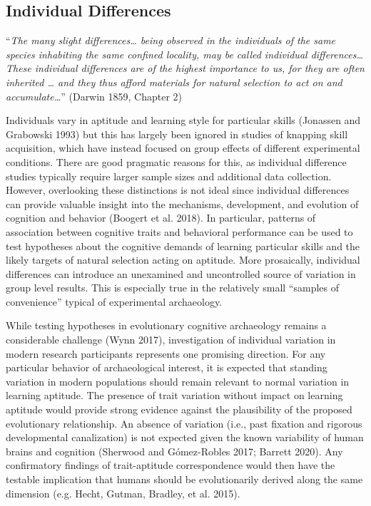 \documentclass[smallextended]{svjour3}       %
\begin{document}
\hypertarget{individual-differences}{%
\subsection{\texorpdfstring{\textbf{Individual
Differences}}{Individual Differences}}\label{individual-differences}}

``\emph{The many slight differences\ldots{} being observed in the
individuals of the same species inhabiting the same confined locality,
may be called individual differences\ldots{} These individual
differences are of the highest importance to us, for they are often
inherited \ldots{} and they thus afford materials for natural selection
to act on and accumulate\ldots{}}'' (Darwin 1859, Chapter 2)

Individuals vary in aptitude and learning style for particular skills
(Jonassen and Grabowski 1993) but this has largely been ignored in
studies of knapping skill acquisition, which have instead focused on
group effects of different experimental conditions. There are good
pragmatic reasons for this, as individual difference studies typically
require larger sample sizes and additional data collection. However,
overlooking these distinctions is not ideal since individual differences
can provide valuable insight into the mechanisms, development, and
evolution of cognition and behavior (Boogert et al. 2018). In
particular, patterns of association between cognitive traits and
behavioral performance can be used to test hypotheses about the
cognitive demands of learning particular skills and the likely targets
of natural selection acting on aptitude. More prosaically, individual
differences can introduce an unexamined and uncontrolled source of
variation in group level results. This is especially true in the
relatively small ``samples of convenience'' typical of experimental
archaeology.

While testing hypotheses in evolutionary cognitive archaeology remains a
considerable challenge (Wynn 2017), investigation of individual
variation in modern research participants represents one promising
direction. For any particular behavior of archaeological interest, it is
expected that standing variation in modern populations should remain
relevant to normal variation in learning aptitude. The presence of trait
variation without impact on learning aptitude would provide strong
evidence against the plausibility of the proposed evolutionary
relationship. An absence of variation (i.e., past fixation and rigorous
developmental canalization) is not expected given the known variability
of human brains and cognition (Sherwood and Gómez-Robles 2017; Barrett
2020). Any confirmatory findings of trait-aptitude correspondence would
then have the testable implication that humans should be evolutionarily
derived along the same dimension (e.g. Hecht, Gutman, Bradley, et al.
2015).
\end{document}
